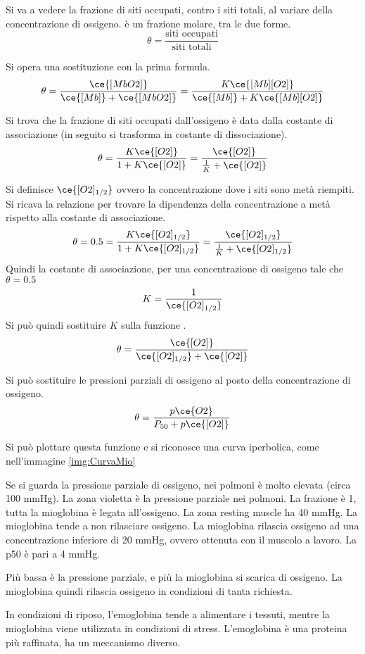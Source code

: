 Si va a vedere la frazione di siti occupati, contro i siti totali, al
variare della concentrazione di ossigeno.{} \theta{} è un frazione molare,
tra le due forme.
\[
\theta = \frac{\text{siti occupati}}{\text{siti totali}}
\]

Si opera una sostituzione con la prima formula.
\[
\theta = \frac{\ce{[MbO2]}}{\ce{[Mb]} + \ce{[MbO2]}} = \frac{K \ce{[Mb][O2]}}{\ce{[Mb]} + K\ce{[Mb][O2]}}
\]

Si trova che la frazione di siti occupati dall'ossigeno è data dalla
costante di associazione (in seguito si trasforma in costante di
dissociazione).
\[
\theta = \frac{K \ce{[O2]}}{1 + K\ce{[O2]}} = \frac{\ce{[O2]}}{\frac{1}{K} + \ce{[O2]}}
\]

Si definisce $\ce{[O2]_{1/2}}$ ovvero la concentrazione dove i siti sono metà riempiti.
Si ricava la relazione per trovare la dipendenza della concentrazione a
metà rispetto alla costante di associazione.
\[
\theta = 0.5 = \frac{K \ce{[O2]_{1/2}}}{1 + K\ce{[O2]_{1/2}}} = \frac{\ce{[O2]_{1/2}}}{\frac{1}{K} + \ce{[O2]_{1/2}}}
\]
Quindi la costante di associazione, per una concentrazione di ossigeno tale che $\theta{} = 0.5$ 
\[
K = \frac{1}{\ce{[O2]_{1/2}}}
\]
Si può quindi sostituire $K$ sulla funzione \theta.
\[
\theta = \frac{\ce{[O2]}}{\ce{[O2]_{1/2}} + \ce{[O2]}}
\]

Si può sostituire le pressioni parziali di ossigeno al posto della
concentrazione di ossigeno.
\[
\theta = \frac{p\ce{O2}}{P_{50} + p\ce{[O2]}}
\]

Si può plottare questa funzione e si riconosce una curva iperbolica, come nell'immagine \ref{img:CurvaMio}


Se si guarda la pressione parziale di ossigeno, nei polmoni è molto elevata (circa 100 mmHg). La zona violetta è la pressione parziale nei polmoni. La frazione è 1, tutta la mioglobina è legata all'ossigeno.
La zona resting muscle ha 40 mmHg. La mioglobina tende a non rilasciare
ossigeno.
La mioglobina rilascia ossigeno ad una concentrazione inferiore di 20
mmHg, ovvero ottenuta con il muscolo a lavoro.
La p50 è pari a 4 mmHg.

Più bassa è la pressione parziale, e più la mioglobina si scarica di
ossigeno. La mioglobina quindi rilascia ossigeno in condizioni di tanta
richiesta.

In condizioni di riposo, l'emoglobina tende a alimentare i tessuti,
mentre la mioglobina viene utilizzata in condizioni di stress.
L'emoglobina è una proteina più raffinata, ha un meccanismo diverso.

